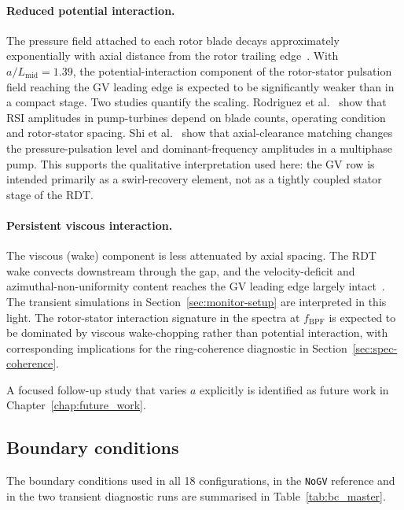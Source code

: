 \paragraph{Reduced potential interaction.}
The pressure field attached to each rotor blade decays approximately exponentially with axial distance from the rotor trailing edge~\cite{Korakianitis1989,Hodson1989}. With $a/L_{\mathrm{mid}} = 1.39$, the potential-interaction component of the rotor-stator pulsation field reaching the GV leading edge is expected to be significantly weaker than in a compact stage. Two studies quantify the scaling. Rodriguez et al.~\cite{Rodriguez2007} show that RSI amplitudes in pump-turbines depend on blade counts, operating condition and rotor-stator spacing. Shi et al.~\cite{Shi2022GapMatching} show that axial-clearance matching changes the pressure-pulsation level and dominant-frequency amplitudes in a multiphase pump. This supports the qualitative interpretation used here: the GV row is intended primarily as a swirl-recovery element, not as a tightly coupled stator stage of the RDT.

\paragraph{Persistent viscous interaction.}
The viscous (wake) component is less attenuated by axial spacing. The RDT wake convects downstream through the gap, and the velocity-deficit and azimuthal-non-uniformity content reaches the GV leading edge largely intact~\cite{Korakianitis1989,Duan2019}. The transient simulations in Section~\ref{sec:monitor-setup} are interpreted in this light. The rotor-stator interaction signature in the spectra at $f_{\mathrm{BPF}}$ is expected to be dominated by viscous wake-chopping rather than potential interaction, with corresponding implications for the ring-coherence diagnostic in Section~\ref{sec:spec-coherence}.

A focused follow-up study that varies $a$ explicitly is identified as future work in Chapter~\ref{chap:future_work}.

\subsection{Boundary conditions}
\label{sec:methods_bc}
 
The boundary conditions used in all 18 configurations, in the \texttt{NoGV} reference and in the two transient diagnostic runs are summarised in Table~\ref{tab:bc_master}.
 
